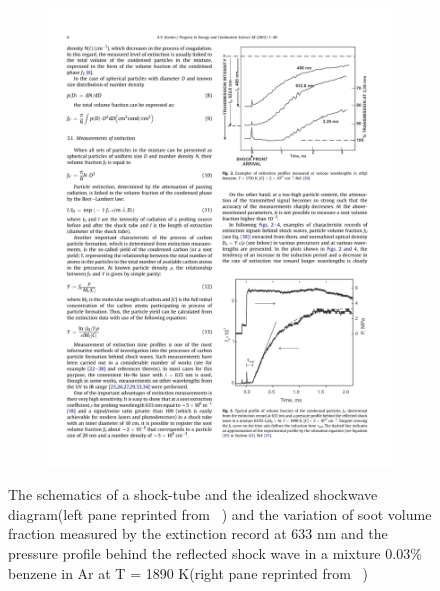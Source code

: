\begin{figure}[!htbp]
\begin{subfigure}[t]{0.4\textwidth}
	\includegraphics[width=1\textwidth]{Figures/Results/Shocktube/pfv_sample_shocktube.pdf}
	\end{subfigure}
	\caption{The schematics of a shock-tube and the idealized shockwave diagram(left pane reprinted from ~\citet{kee2017chemically}) and the variation of soot volume fraction measured by the extinction record at 633 nm and the pressure profile behind the reflected shock wave in a mixture 0.03\% benzene in Ar at T = 1890 K(right pane reprinted from ~\citet{karasevich1994soot})}
	\label{fig:shocktubeschem}
\end{figure}




